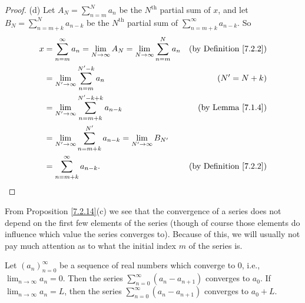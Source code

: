 \begin{proof}{(d)}
    Let \(A_N = \sum_{n = m}^N a_n\) be the \(N^{\text{th}}\) partial sum of \(x\), and let \(B_N = \sum_{n = m + k}^N a_{n - k}\) be the \(N^{\text{th}}\) partial sum of \(\sum_{n = m + k}^\infty a_{n - k}\).
    So
    \begin{align*}
        x & = \sum_{n = m}^\infty a_n = \lim_{N \to \infty} A_N = \lim_{N \to \infty} \sum_{n = m}^N a_n & \text{(by Definition \ref{7.2.2})} \\
          & = \lim_{N' \to \infty} \sum_{n = m}^{N' - k} a_n                                             & (N' = N + k)                       \\
          & = \lim_{N' \to \infty} \sum_{n = m + k}^{N' - k + k} a_{n - k}                               & \text{(by Lemma \ref{7.1.4})}      \\
          & = \lim_{N' \to \infty} \sum_{n = m + k}^{N'} a_{n - k} = \lim_{N' \to \infty} B_{N'}                                              \\
          & = \sum_{n = m + k}^\infty a_{n - k}.                                                         & \text{(by Definition \ref{7.2.2})}
    \end{align*}
\end{proof}

\begin{note}
    From Proposition \ref{7.2.14}(c) we see that the convergence of a series does not depend on the first few elements of the series
    (though of course those elements do influence which value the series converges to).
    Because of this, we will usually not pay much attention as to what the initial index \(m\) of the series is.
\end{note}

\begin{lemma}\label{7.2.15}
    Let \((a_n)_{n = 0}^\infty\) be a sequence of real numbers which converge to \(0\), i.e., \(\lim_{n \to \infty} a_n = 0\).
    Then the series \(\sum_{n = 0}^\infty (a_n - a_{n + 1})\) converges to \(a_0\).
    If \(\lim_{n \to \infty} a_n = L\), then the series \(\sum_{n = 0}^\infty (a_n - a_{n + 1})\) converges to \(a_0 + L\).
\end{lemma}

